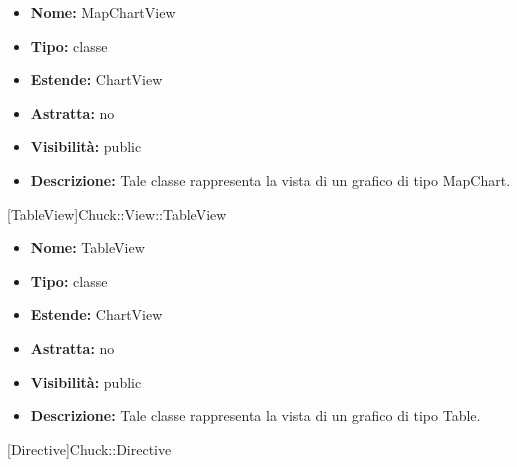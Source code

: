 			
			\begin{itemize}
			\item \textbf{Nome:} MapChartView
			\item \textbf{Tipo:} classe
			
		\item \textbf{Estende:}
		ChartView
		\item \textbf{Astratta:}
		no
			\item \textbf{Visibilità:} public
			\item \textbf{Descrizione:} Tale classe rappresenta la vista di un grafico di tipo MapChart.
			\end{itemize}

			
			[TableView]{Chuck::View::TableView}
			

	
			
			\begin{itemize}
			\item \textbf{Nome:} TableView
			\item \textbf{Tipo:} classe
			
		\item \textbf{Estende:}
		ChartView
		\item \textbf{Astratta:}
		no
			\item \textbf{Visibilità:} public
			\item \textbf{Descrizione:} Tale classe rappresenta la vista di un grafico di tipo Table.
			\end{itemize}

			
			[Directive]{Chuck::Directive}
			

